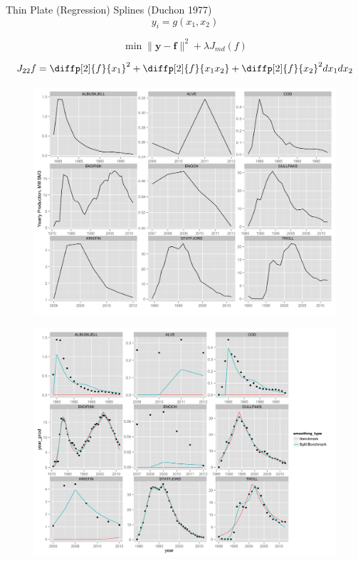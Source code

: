 \documentclass{beamer}
\begin{document}
\begin{frame}[plain]
	Thin Plate (Regression) Splines (Duchon 1977)
	\begin{equation}
	y_i = g(x_1, x_2)
	\end{equation}

	\begin{equation}
	\min \|\boldsymbol{y-f}\|^2 + \lambda J_{md}(f)
	\end{equation}

	\begin{equation}
	J_{22}{f}= \diffp[2]{f}{x_1}^2 + \diffp[2]{f}{{x_1}{x_2}} + \diffp[2]{f}{x_2}^2dx_1 dx_2
	\end{equation}
\end{frame}

\begin{frame}[plain]
	\begin{figure}
		\includegraphics[width=.8\textwidth]{field_inspection.png}
		\caption{}
		\label{field_inspection}
	\end{figure}
\end{frame}


\begin{frame}[plain]
	\begin{figure}
		\includegraphics[width=.8\textwidth]{bench_vs_split.png}
		\caption{}
		\label{bench_vs_split}
	\end{figure}
\end{frame}
\end{document}
